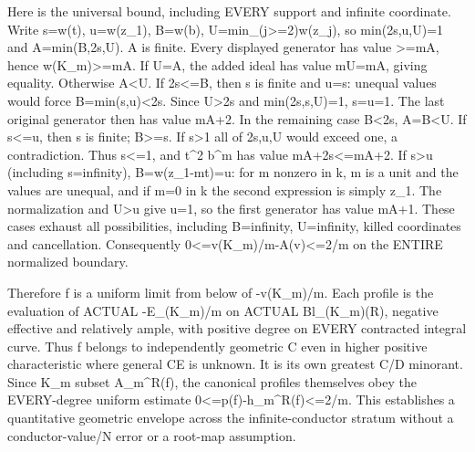 Here is the universal bound, including EVERY support and infinite coordinate. Write s=w(t), u=w(z\_1), B=w(b), U=min\_(j\textgreater{}=2)w(z\_j), so min(2s,u,U)=1 and A=min(B,2s,U). A is finite. Every displayed generator has value \textgreater{}=mA, hence w(K\_m)\textgreater{}=mA. If U=A, the added ideal has value mU=mA, giving equality. Otherwise A\textless{}U. If 2s\textless{}=B, then s is finite and u=s: unequal values would force B=min(s,u)\textless{}2s. Since U\textgreater{}2s and min(2s,s,U)=1, s=u=1. The last original generator then has value mA+2. In the remaining case B\textless{}2s, A=B\textless{}U. If s\textless{}=u, then s is finite; B\textgreater{}=s. If s\textgreater{}1 all of 2s,u,U would exceed one, a contradiction. Thus s\textless{}=1, and t\textasciicircum{}2 b\textasciicircum{}m has value mA+2s\textless{}=mA+2. If s\textgreater{}u (including s=infinity), B=w(z\_1-mt)=u: for m nonzero in k, m is a unit and the values are unequal, and if m=0 in k the second expression is simply z\_1. The normalization and U\textgreater{}u give u=1, so the first generator has value mA+1. These cases exhaust all possibilities, including B=infinity, U=infinity, killed coordinates and cancellation. Consequently
0\textless{}=v(K\_m)/m-A(v)\textless{}=2/m on the ENTIRE normalized boundary.

Therefore f is a uniform limit from below of -v(K\_m)/m. Each profile is the evaluation of ACTUAL -E\_(K\_m)/m on ACTUAL Bl\_(K\_m)(R), negative effective and relatively ample, with positive degree on EVERY contracted integral curve. Thus f belongs to independently geometric C even in higher positive characteristic where general CE is unknown. It is its own greatest C/D minorant. Since K\_m subset A\_m\textasciicircum{}R(f), the canonical profiles themselves obey the EVERY-degree uniform estimate 0\textless{}=p(f)-h\_m\textasciicircum{}R(f)\textless{}=2/m. This establishes a quantitative geometric envelope across the infinite-conductor stratum without a conductor-value/N error or a root-map assumption.

